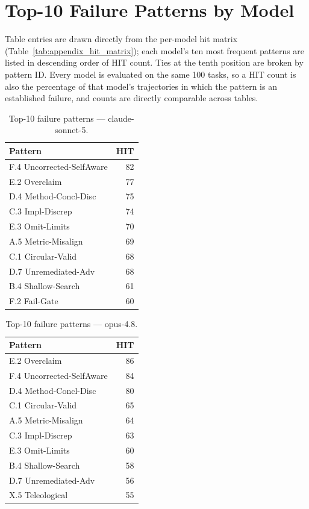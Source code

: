 \section{Top-10 Failure Patterns by Model}
\label{sec:top10_by_model}

Table entries are drawn directly from the per-model hit matrix
(Table~\ref{tab:appendix_hit_matrix}); each model's ten most frequent
patterns are listed in descending order of HIT count. Ties at the tenth
position are broken by pattern ID. Every model is evaluated on the same
100 tasks, so a HIT count is also the percentage of that model's
trajectories in which the pattern is an established failure, and counts are
directly comparable across tables.

\begin{table}[H]
\centering\small
\caption{Top-10 failure patterns --- claude-sonnet-5.}
\label{tab:top10_son}
\begin{tabular}{@{}lr@{}}
\toprule
Pattern & HIT \\
\midrule
F.4 Uncorrected-SelfAware & 82 \\
E.2 Overclaim             & 77 \\
D.4 Method-Concl-Disc     & 75 \\
C.3 Impl-Discrep          & 74 \\
E.3 Omit-Limits           & 70 \\
A.5 Metric-Misalign       & 69 \\
C.1 Circular-Valid        & 68 \\
D.7 Unremediated-Adv      & 68 \\
B.4 Shallow-Search        & 61 \\
F.2 Fail-Gate             & 60 \\
\bottomrule
\end{tabular}

\end{table}

\begin{table}[H]
\centering\small
\caption{Top-10 failure patterns --- opus-4.8.}
\label{tab:top10_opu}
\begin{tabular}{@{}lr@{}}
\toprule
Pattern & HIT \\
\midrule
E.2 Overclaim             & 86 \\
F.4 Uncorrected-SelfAware & 84 \\
D.4 Method-Concl-Disc     & 80 \\
C.1 Circular-Valid        & 65 \\
A.5 Metric-Misalign       & 64 \\
C.3 Impl-Discrep          & 63 \\
E.3 Omit-Limits           & 60 \\
B.4 Shallow-Search        & 58 \\
D.7 Unremediated-Adv      & 56 \\
X.5 Teleological          & 55 \\
\bottomrule
\end{tabular}

\end{table}

